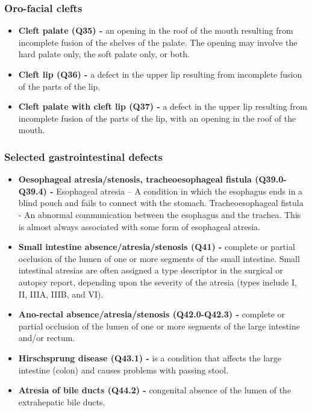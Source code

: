 \documentclass[
]{krantz}
\begin{document}
\hypertarget{section-2115}{%
\subsubsection{Oro-facial clefts}\label{section-2115}}

\begin{itemize}
\item
  \textbf{Cleft palate (Q35) -} an opening in the roof of the mouth resulting from incomplete fusion of the shelves of the palate. The opening may involve the hard palate only, the soft palate only, or both.
\item
  \textbf{Cleft lip (Q36) -} a defect in the upper lip resulting from incomplete fusion of the parts of the lip.
\item
  \textbf{Cleft palate with cleft lip (Q37) -} a defect in the upper lip resulting from incomplete fusion of the parts of the lip, with an opening in the roof of the mouth.
\end{itemize}

\hypertarget{section-2116}{%
\subsubsection{Selected gastrointestinal defects}\label{section-2116}}

\begin{itemize}
\item
  \textbf{Oesophageal atresia/stenosis, tracheoesophageal fistula (Q39.0-Q39.4) -} Esophageal atresia -- A condition in which the esophagus ends in a blind pouch and fails to connect with the stomach. Tracheoesophageal fistula - An abnormal communication between the esophagus and the trachea. This is almost always associated with some form of esophageal atresia.
\item
  \textbf{Small intestine absence/atresia/stenosis (Q41) -} complete or partial occlusion of the lumen of one or more segments of the small intestine. Small intestinal atresias are often assigned a type descriptor in the surgical or autopsy report, depending upon the severity of the atresia (types include I, II, IIIA, IIIB, and VI).
\item
  \textbf{Ano-rectal absence/atresia/stenosis (Q42.0-Q42.3) -} complete or partial occlusion of the lumen of one or more segments of the large intestine and/or rectum.
\item
  \textbf{Hirschsprung disease (Q43.1) -} is a condition that affects the large intestine (colon) and causes problems with passing stool.
\item
  \textbf{Atresia of bile ducts (Q44.2) -} congenital absence of the lumen of the extrahepatic bile ducts.
\end{itemize}
\end{document}

